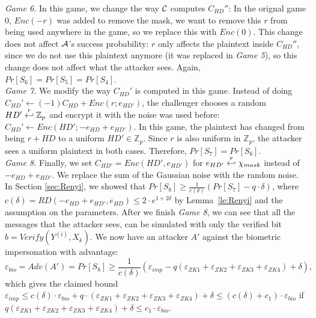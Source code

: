 \textit{Game 6.} In this game, we change the way $\mathcal{C}$ computes $C_{HD}''$: In the orignal game 0, $Enc(-r)$ was
added to remove the mask, we want to remove this $r$ from being used anywhere in the game, so we replace this with
$Enc(0)$. This change does not affect $\mathcal{A}$'s success probability: $r$ only affects the plaintext inside
$C_{HD}''$, since we do not use this plaintext anymore (it was replaced in \textit{Game 5}), so this change
does not affect what the attacker sees. Again, $Pr[S_6] = Pr[S_5] = Pr[S_4]$.\\
\textit{Game 7.} We modify the way $C_{HD}'$ is computed in this game. Instead of doing
$C_{HD}' \gets (-1)C_{HD} + Enc(r;e_{HD'})$, the challenger chooses a random $HD' \stackrel{r}{\hookleftarrow} \mathbb{Z}_p$ and
encrypt it with the noise was used before: $C_{HD}' \gets Enc(HD'; -e_{HD} + e_{HD'})$. In this game, the plaintext has
changed from being $r + HD$ to a uniform $HD' \in \mathbb{Z}_p$.  Since $r$ is also uniform in $\mathbb{Z}_p$, the
attacker sees a uniform
plaintext in both cases. Therefore, $Pr[S_7] = Pr[S_6]$.\\
\textit{Game 8.} Finally, we set $C_{HD'} = Enc(HD', e_{HD'})$ for $e_{HD'} \stackrel{r}{\hookleftarrow} \chi_{mask}$ instead of
$-e_{HD} + e_{HD'}$. We replace the sum of the Gaussian noise with the random noise. In Section \ref{sec:Renyi}, we
showed that $Pr[S_8] \geq \frac{1}{c(\delta)}(Pr[S_7]-q \cdot \delta)$, where
$c(\delta) = RD(-e_{HD} + e_{HD'}, e_{HD}) \leq 2 \cdot e^{1+2\delta}$ by Lemma~\ref{le:Renyi} and the assumption on the
parameters. After we finish \textit{Game 8}, we can see that all the messages that the attacker sees, can be simulated
with only the verified bit $b = Verify(Y^{(i)}, X_k)$. We now have an attacker $A'$ against the biometric impersonation
with advantage:
\[
\varepsilon_{bio} = Adv(A') = Pr[S_8] \geq \frac{1}{c(\delta)}(\varepsilon_{imp} - q(\varepsilon_{ZK1}+\varepsilon_{ZK2} +
\varepsilon_{ZK3} + \varepsilon_{ZK4}) + \delta),
\]
which gives the claimed bound $\varepsilon_{imp} \leq c(\delta) \cdot \varepsilon_{bio} + q \cdot (\varepsilon_{ZK1}+\varepsilon_{ZK2} +
\varepsilon_{ZK3} + \varepsilon_{ZK4}) + \delta \leq (c(\delta)+c_1) \cdot \varepsilon_{bio}$ if $q(\varepsilon_{ZK1}+\varepsilon_{ZK2} +
\varepsilon_{ZK3} + \varepsilon_{ZK4}) + \delta \leq c_1 \cdot \varepsilon_{bio}$.


